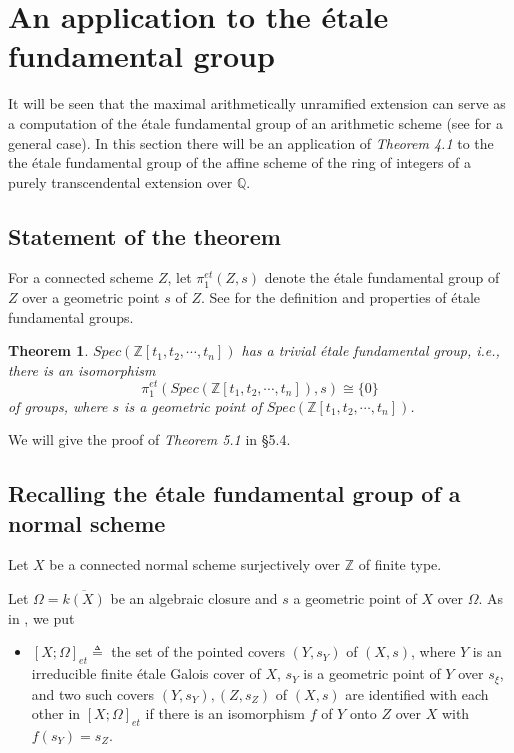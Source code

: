 \documentclass{amsart}
\newtheorem{theorem}{Theorem}[section]
\theoremstyle{definition}
\numberwithin{equation}{section}
\begin{document}
\section{An application to the \'{e}tale fundamental group}

It will be seen that the maximal arithmetically unramified extension can serve as a computation of the \'{e}tale fundamental group of an arithmetic scheme (see \cite{an2,an4} for a general case).
In this section there will be an application of  \emph{Theorem 4.1} to the the \'{e}tale fundamental group of the affine scheme of the ring of integers of a purely transcendental extension over $\mathbb{Q}$.

\subsection{Statement of the theorem}

For a connected scheme $Z$, let $\pi
_{1}^{et}\left( Z,s\right) $ denote the \'{e}tale fundamental group of $Z$ over a
geometric point $s$ of $Z$. See \cite{f-k,sga1,mln,sz} for the definition and properties of \'{e}tale fundamental groups.

\begin{theorem}
$Spec(\mathbb{Z}[t_{1},t_{2},\cdots,t_{n}])$ has a trivial \'{e}tale fundamental group, i.e., there is an isomorphism
$$
\pi _{1}^{et}\left( Spec(\mathbb{Z}[t_{1},t_{2},\cdots,t_{n}]),s\right) \cong \{0\}
$$
of groups, where $s$ is a geometric point of $Spec(\mathbb{Z}[t_{1},t_{2},\cdots,t_{n}])$.
\end{theorem}

We will give the proof of \emph{Theorem 5.1} in \S 5.4.


\subsection{Recalling the \'{e}tale fundamental group of a normal scheme}

Let $X$ be a connected normal scheme surjectively over $\mathbb{Z}$ of finite type.

Let $\Omega=\overline{k(X)}$ be an algebraic closure and $s$  a geometric point of $X$ over $\Omega$.
As in \cite{an2,an4}, we put
\begin{itemize}
\item $\left[X; \Omega \right]_{et}\triangleq$ the set of the pointed covers
$(Y,s_{Y})$ of $(X,s)$, where $Y$ is an irreducible finite \'{e}tale
Galois cover of $X$, $s_{Y} $ is a geometric point of $Y$ over $s_{\xi}$,
and two such covers $(Y,s_{Y}),(Z,s_{Z}) $ of $(X,s)$ are identified
with each other in $\left[X; \Omega \right]_{et}$ if there is an isomorphism
$f$ of $Y$ onto $Z$ over $X$ with $f(s_{Y})=s_{Z}$.
\end{itemize}
\end{document}
